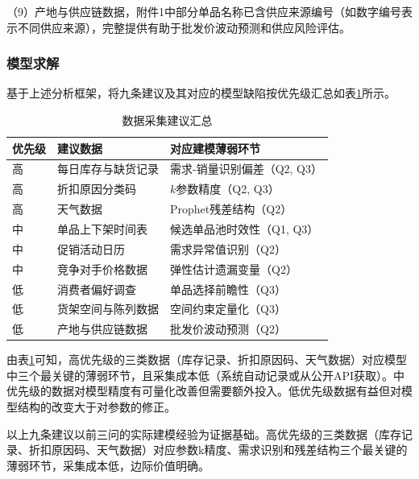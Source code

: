 （9）产地与供应链数据，附件1中部分单品名称已含供应来源编号（如数字编号表示不同供应来源），完整提供有助于批发价波动预测和供应风险评估。

\subsubsection{模型求解}

基于上述分析框架，将九条建议及其对应的模型缺陷按优先级汇总如表\ref{tab:q4summary}所示。

\begin{table}[H]
  \centering
  \caption{数据采集建议汇总}
  \label{tab:q4summary}
  \begin{tabularx}{\textwidth}{>{\centering\arraybackslash}p{}>{\centering\arraybackslash}p{}>{\centering\arraybackslash}p{}}
    \toprule
    优先级 & 建议数据 & 对应建模薄弱环节 \\
    \midrule
    高 & 每日库存与缺货记录 & 需求-销量识别偏差（Q2, Q3） \\
    高 & 折扣原因分类码 & $k$参数精度（Q2, Q3） \\
    高 & 天气数据 & Prophet残差结构（Q2） \\
    中 & 单品上下架时间表 & 候选单品池时效性（Q1, Q3） \\
    中 & 促销活动日历 & 需求异常值识别（Q2） \\
    中 & 竞争对手价格数据 & 弹性估计遗漏变量（Q2） \\
    低 & 消费者偏好调查 & 单品选择前瞻性（Q3） \\
    低 & 货架空间与陈列数据 & 空间约束定量化（Q3） \\
    低 & 产地与供应链数据 & 批发价波动预测（Q2） \\
    \bottomrule
  \end{tabularx}
\end{table}

由表\ref{tab:q4summary}可知，高优先级的三类数据（库存记录、折扣原因码、天气数据）对应模型中三个最关键的薄弱环节，且采集成本低（系统自动记录或从公开API获取）。中优先级的数据对模型精度有可量化改善但需要额外投入。低优先级数据有益但对模型结构的改变大于对参数的修正。

以上九条建议以前三问的实际建模经验为证据基础。高优先级的三类数据（库存记录、折扣原因码、天气数据）对应参数k精度、需求识别和残差结构三个最关键的薄弱环节，采集成本低，边际价值明确。
